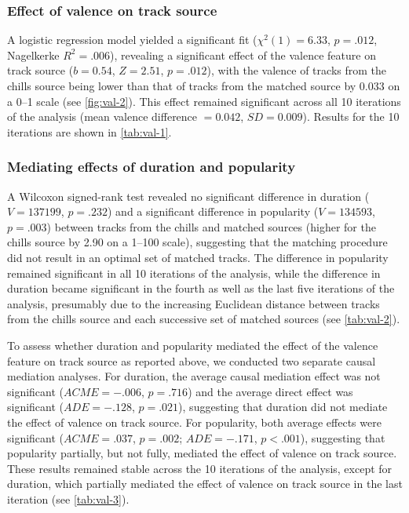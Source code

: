 \subsubsection{Effect of valence on track source}

A logistic regression model yielded a significant fit ($\chi^2(1) = 6.33$, $p = .012$, Nagelkerke $R^2 = .006$), revealing a significant effect of the valence feature on track source ($b = 0.54$, $Z = 2.51$, $p = .012$), with the valence of tracks from the chills source being lower than that of tracks from the matched source by 0.033 on a 0--1 scale (see \autoref{fig:val-2}). This effect remained significant across all 10 iterations of the analysis (mean valence difference $= 0.042$, $SD = 0.009$). Results for the 10 iterations are shown in \autoref{tab:val-1}.



\subsubsection{Mediating effects of duration and popularity}
\label{se:val-results-2}

A Wilcoxon signed-rank test revealed no significant difference in duration ($V = 137199$, $p = .232$) and a significant difference in popularity ($V = 134593$, $p = .003$) between tracks from the chills and matched sources (higher for the chills source by 2.90 on a 1--100 scale), suggesting that the matching procedure did not result in an optimal set of matched tracks. The difference in popularity remained significant in all 10 iterations of the analysis, while the difference in duration became significant in the fourth as well as the last five iterations of the analysis, presumably due to the increasing Euclidean distance between tracks from the chills source and each successive set of matched sources (see \autoref{tab:val-2}).



To assess whether duration and popularity mediated the effect of the valence feature on track source as reported above, we conducted two separate causal mediation analyses. For duration, the average causal mediation effect was not significant ($ACME = -.006$, $p = .716$) and the average direct effect was significant ($ADE = -.128$, $p = .021$), suggesting that duration did not mediate the effect of valence on track source. For popularity, both average effects were significant ($ACME = .037$, $p = .002$; $ADE = -.171$, $p < .001$), suggesting that popularity partially, but not fully, mediated the effect of valence on track source. These results remained stable across the 10 iterations of the analysis, except for duration, which partially mediated the effect of valence on track source in the last iteration (see \autoref{tab:val-3}).

